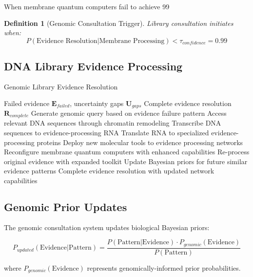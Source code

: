 \documentclass[12pt,a4paper]{article}
\newtheorem{definition}[theorem]{Definition}
\begin{document}
When membrane quantum computers fail to achieve 99%

\begin{definition}[Genomic Consultation Trigger]
Library consultation initiates when:
\begin{equation}
P(\text{Evidence Resolution}|\text{Membrane Processing}) < \tau_{confidence} = 0.99
\end{equation}
\end{definition}

\subsection{DNA Library Evidence Processing}

\begin{algorithm}
\caption{Genomic Library Evidence Resolution}
\begin{algorithmic}[1]
\REQUIRE Failed evidence $\mathbf{E}_{failed}$, uncertainty gaps $\mathbf{U}_{gaps}$
\ENSURE Complete evidence resolution $\mathbf{R}_{complete}$
\STATE Generate genomic query based on evidence failure pattern
\STATE Access relevant DNA sequences through chromatin remodeling
\STATE Transcribe DNA sequences to evidence-processing RNA
\STATE Translate RNA to specialized evidence-processing proteins
\STATE Deploy new molecular tools to evidence processing networks
\STATE Reconfigure membrane quantum computers with enhanced capabilities
\STATE Re-process original evidence with expanded toolkit
\STATE Update Bayesian priors for future similar evidence patterns
\RETURN Complete evidence resolution with updated network capabilities
\end{algorithmic}
\end{algorithm}

\subsection{Genomic Prior Updates}

The genomic consultation system updates biological Bayesian priors:

\begin{equation}
P_{updated}(\text{Evidence}|\text{Pattern}) = \frac{P(\text{Pattern}|\text{Evidence}) \cdot P_{genomic}(\text{Evidence})}{P(\text{Pattern})}
\end{equation}

where $P_{genomic}(\text{Evidence})$ represents genomically-informed prior probabilities.
\end{document}
